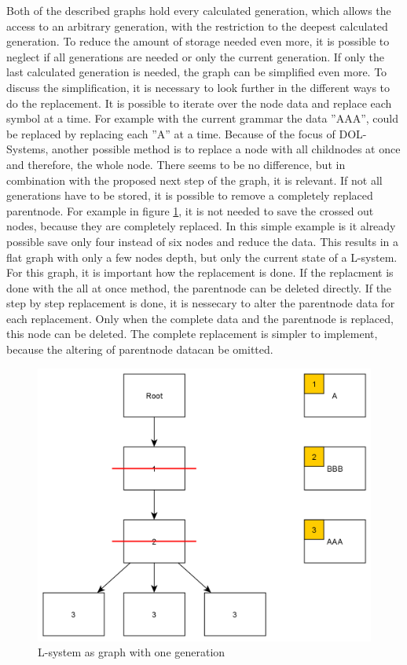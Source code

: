 \documentclass[english]{cpp-hmwk}
\begin{document}
\medskip
\noindent Both of the described graphs hold every calculated generation, which allows the access to an arbitrary generation, with the restriction to the deepest calculated generation. To reduce the amount of storage needed even more, it is possible to neglect if all generations are needed or only the current generation. If only the last calculated generation is needed, the graph can be simplified even more. To discuss the simplification, it is necessary to look further in the different ways to do the replacement. It  is possible to iterate over the node data and replace each symbol at a time. For example with the current grammar the data ''AAA'', could be replaced by replacing each ''A'' at a time. Because of the focus of DOL-Systems, another possible method is to replace a node with all childnodes at once and therefore, the whole node.\newline
There seems to be no difference, but in combination with the proposed next step of the graph, it is relevant. If not all generations have to be stored, it is possible to remove a completely replaced parentnode. For example in figure \ref{figure:lsystem_graph_one_generation}, it is not needed to save the crossed out nodes, because they are completely replaced. In this simple example is it already possible save only four instead of six nodes and reduce the data. This results in a flat graph with only a few nodes depth, but only the current state of a L-system. For this graph, it is  important how the replacement is done. If the replacment is done with the all at once method, the parentnode can be deleted directly. If the step by step replacement is done, it is nessecary to alter the parentnode data for each replacement. Only when the complete data and the parentnode is replaced, this node can be deleted. The complete replacement is simpler to implement, because the altering of parentnode datacan be omitted.

\begin{figure}[h!]
	\centering
	\includegraphics[width=0.8\columnwidth]{../graphs/lsystem_graph_reduced2_example.png}
	\caption{L-system as graph with one generation}
	\label{figure:lsystem_graph_one_generation}
\end{figure}
\end{document}
